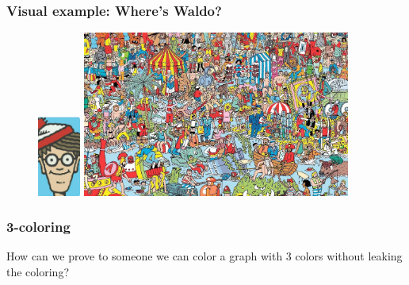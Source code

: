 \documentclass[shadesubsections,compress,14pt,mathserif]{beamer}
\begin{document}
\begin{frame}
  \frametitle{Visual example: Where's Waldo?}   %
 \begin{figure}
  \includegraphics[width=40pt]{waldopic.png}
  \includegraphics[width=250pt]{waldo.jpg}
\end{figure}

\end{frame}




\begin{frame}
 \frametitle{3-coloring}
 How can we prove to someone we can color a graph with 3 colors without leaking the coloring?
\end{frame}



%   
%   
% 
\end{document}

